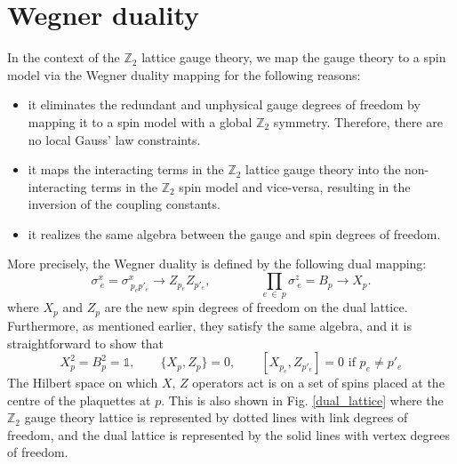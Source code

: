 \documentclass[../thesis_main.tex]{subfiles}
\begin{document}
\section{Wegner duality}
In the context of the $\mathbb{Z}_2$ lattice gauge theory, we map the gauge theory to a spin model via the Wegner duality mapping for the following reasons:
\begin{itemize}
    \setlength{\itemsep}{0.1em}
    \item it eliminates the redundant and unphysical gauge degrees of freedom by mapping it to a spin model with a global $\mathbb{Z}_2$ symmetry. Therefore, there are no local Gauss' law constraints.
    \item it maps the interacting terms in the $\mathbb{Z}_2$ lattice gauge theory into the non-interacting terms in the $\mathbb{Z}_2$ spin model and vice-versa, resulting in the inversion of the coupling constants. 
    \item it realizes the same algebra between the gauge and spin degrees of freedom.
\end{itemize}
More precisely, the Wegner duality is defined by the following
dual mapping:
\begin{equation}
    \sigma^x_{\: e} = \sigma^x_{\: p_e p'_e} \longrightarrow Z_{p_e} Z_{p'_e}, \qquad\qquad \prod_{e \: \in \: p} \sigma^z_{\:e} = B_p \longrightarrow X_p.
\end{equation}
where $X_p$ and $Z_p$ are the new spin degrees of freedom on the dual lattice. Furthermore, as mentioned earlier, they satisfy the same algebra, and it is straightforward to show that
\begin{equation}
    X_p^2 = B_p^2 = \mathds{1}, \qquad \{X_p, Z_p\} = 0, \qquad [X_{p_e}, Z_{p'_e}] = 0 \text{  if } p_e \neq p'_e   
\end{equation} 
The Hilbert space on which $X$, $Z$ operators act is on a set of spins placed at the centre of the plaquettes at $p$. This is also shown in Fig. \ref{dual_lattice} where the $\mathbb{Z}_2$ gauge theory lattice is represented by dotted lines with link degrees of freedom, and the dual lattice is represented by the solid lines with vertex degrees of freedom.
\end{document}
